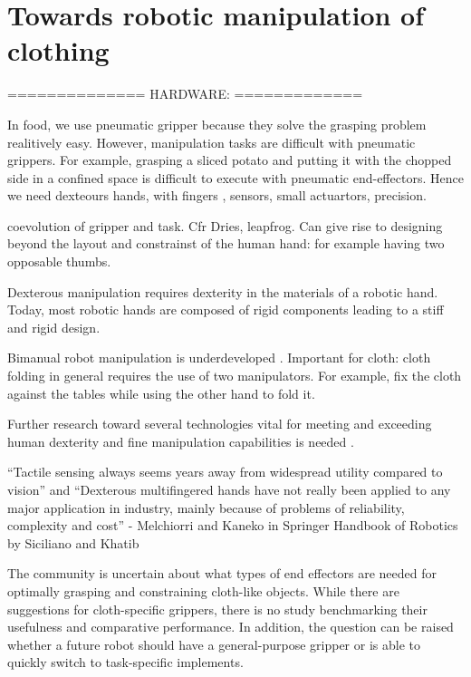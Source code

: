 \documentclass[\home/main.tex]{subfiles}
\begin{document}
\chapter{Towards robotic manipulation of clothing }\label{ch:towards_robotic_folding}


==============
HARDWARE:
=============

In food, we use pneumatic gripper because they solve the grasping problem realitively easy. However, manipulation tasks are difficult with pneumatic grippers. For example, grasping a sliced potato and putting it with the chopped side in a confined space is difficult to execute with pneumatic end-effectors. Hence we need dexteours hands, with fingers , sensors, small actuartors, precision. 

coevolution of gripper and task. Cfr Dries, leapfrog. 
Can give rise to designing beyond the layout and constrainst of the human hand: for example having two opposable thumbs. %

Dexterous manipulation requires dexterity in the materials of a robotic hand. Today, most robotic hands are composed of rigid components leading to a stiff and rigid design. %

Bimanual robot manipulation is underdeveloped \autocite{Billard2019}. Important for cloth: cloth folding in general requires the use of two manipulators. For example, fix the cloth against the tables while using the other hand to fold it. 

Further research toward several technologies vital for meeting and exceeding human dexterity and fine manipulation capabilities is needed .

“Tactile sensing always seems years away from widespread utility compared to vision” 
and
“Dexterous multifingered hands have not really been applied to any major application in industry, mainly because of problems of reliability, complexity and cost” 
  - Melchiorri and Kaneko in Springer Handbook of Robotics by Siciliano and Khatib


 The community is uncertain about what types of end effectors are needed for optimally grasping and constraining cloth-like objects. While there are suggestions for cloth-specific grippers, there is no study benchmarking their usefulness and comparative performance. In addition, the question can be raised whether a future robot should have a general-purpose gripper or is able to quickly switch to  task-specific implements.  
\end{document}
